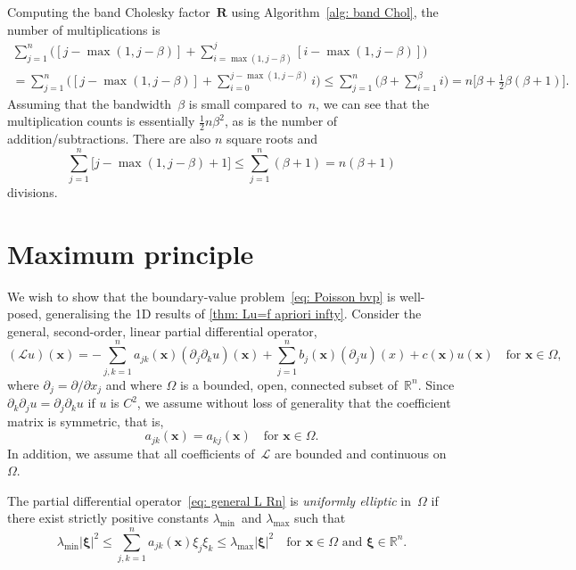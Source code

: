Computing the band Cholesky factor~$\boldsymbol{R}$ using 
Algorithm~\ref{alg: band Chol}, the number of multiplications is
\begin{multline*}
\sum_{j=1}^n\biggl([j-\max(1,j-\beta)]
+\sum_{i=\max(1,j-\beta)}^j[i-\max(1,j-\beta)]\biggr)\\
	=\sum_{j=1}^n\biggl([j-\max(1,j-\beta)]
	+\sum_{i=0}^{j-\max(1,j-\beta)}i\biggr)
	\le\sum_{j=1}^n\biggl(\beta+\sum_{i=1}^\beta i\biggr)
	=n\bigl[\beta+\tfrac12\beta(\beta+1)\bigr].
\end{multline*}
Assuming that the bandwidth~$\beta$ is small compared to~$n$, we can see that 
the multiplication counts is essentially $\tfrac12n\beta^2$, as is the number 
of addition/subtractions.  There are also $n$ square roots and
\[
\sum_{j=1}^n\bigl[j-\max(1,j-\beta)+1]\le\sum_{j=1}^n(\beta+1)=n(\beta+1)
\]
divisions.


\section{Maximum principle}
\newcommand{\bx}{\boldsymbol{x}}
\newcommand{\by}{\boldsymbol{y}}
We wish to show that the boundary-value problem~\eqref{eq: Poisson bvp} is
well-posed, generalising the 1D results of \cref{thm: Lu=f apriori infty}.
Consider the general, second-order, linear partial differential operator,
\begin{equation}\label{eq: general L Rn}
(\mathcal{L}u)(\bx)
	=-\sum_{j,k=1}^na_{jk}(\bx)(\partial_j\partial_ku)(\bx)
	+\sum_{j=1}^nb_j(\bx)(\partial_ju)(x)+c(\bx)u(\bx)
\quad\text{for $\bx\in\Omega$,}
\end{equation}
where $\partial_j=\partial/\partial x_j$ and where $\Omega$ is a bounded,
open, connected subset of~$\mathbb{R}^n$.  Since 
$\partial_k\partial_ju=\partial_j\partial_ku$ if $u$ is $C^2$, we assume
without loss of generality that the coefficient matrix is symmetric, that is,
\[
a_{jk}(\bx)=a_{kj}(\bx)\quad\text{for $\bx\in\Omega$.}
\]
In addition, we assume that all coefficients of~$\mathcal{L}$ are bounded
and continuous on~$\Omega$.  

\begin{definition}
The partial differential operator~\eqref{eq: general L Rn} is
\emph{uniformly elliptic} in~$\Omega$ if there exist strictly positive 
constants $\lambda_{\min}$~and $\lambda_{\max}$ such that
\[
\lambda_{\min}|\boldsymbol{\xi}|^2\le\sum_{j,k=1}^na_{jk}(\bx)\xi_j\xi_k
	\le\lambda_{\max}|\boldsymbol{\xi}|^2
\quad\text{for $\bx\in\Omega$ and $\boldsymbol{\xi}\in\mathbb{R}^n$.}
\]
\end{definition}


